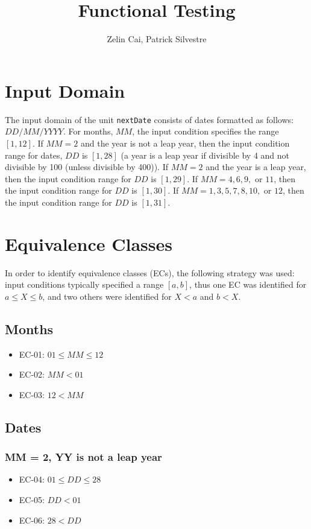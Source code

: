 \documentclass[11pt, oneside]{article}   	%
\title{Functional Testing}
\author{Zelin Cai, Patrick Silvestre}
\date{}
\begin{document}
\maketitle

\section{Input Domain}
The input domain of the unit \texttt{nextDate} consists of dates formatted as follows: $DD/MM/YYYY$. For months, $MM$, the input condition specifies the range $[1, 12]$. If $MM = 2$ and the year is not a leap year, then the input condition range for dates, $DD$ is $[1, 28]$ (a year is a leap year if divisible by 4 and not divisible by 100 (unless divisible by 400)). If $MM = 2$  and the year is a leap year, then the input condition range for $DD$ is $[1, 29]$. If $MM = 4, 6, 9,$ or $11$, then the input condition range for $DD$ is $[1, 30]$. If $MM = 1, 3, 5, 7, 8, 10,$ or $12$, then the input condition range for $DD$ is $[1, 31]$.

\section{Equivalence Classes}
In order to identify equivalence classes (ECs), the following strategy was used: input conditions typically specified a range $[a, b]$, thus one EC was identified for $a \leq X \leq b$, and two others were identified for $X < a$ and $b < X$.

\subsection{Months}
	\begin{itemize}
		\item{EC-01: $01 \leq MM \leq 12$}
		\item{EC-02: $MM < 01$}
		\item{EC-03: $12 < MM$}
	\end{itemize}

\subsection{Dates}
\subsubsection{MM = 2, YY is not a leap year}
	\begin{itemize}
		\item{EC-04: $01 \leq DD \leq 28$}
		\item{EC-05: $DD < 01$}
		\item{EC-06: $28 < DD$}
	\end{itemize}
\end{document}

